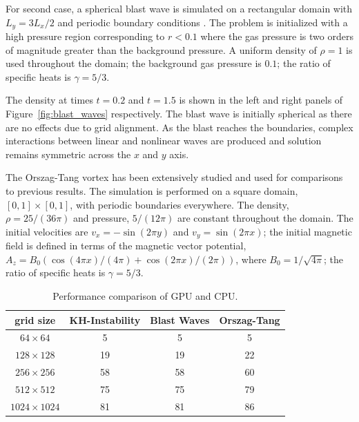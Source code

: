 For second case, a spherical blast wave is simulated on a rectangular domain with $L_y = 3L_x/2$ and periodic boundary conditions \citep{Zachary:1994,Balsara:1999,Londrillo:2000}.  The problem is initialized with a high pressure region corresponding to $r < 0.1$ where the gas pressure is two orders of magnitude greater than the background pressure.  A uniform density of $\rho = 1$ is used throughout the domain; the background gas pressure is $0.1$; the ratio of specific heats is $\gamma = 5/3$.

The density at times $t = 0.2$ and $t = 1.5$ is shown in the left and right panels of Figure~\ref{fig:blast_waves} respectively.  The blast wave is initially spherical as there are no effects due to grid alignment.  As the blast reaches the boundaries, complex interactions between linear and nonlinear waves are produced and solution remains symmetric across the $x$ and $y$ axis.  

The Orszag-Tang vortex \citep{Orszag:1979} has been extensively studied and used for comparisons to previous results.  The simulation is performed on a square domain, $[0,1] \times [0,1]$, with periodic boundaries everywhere.  The density, $\rho = 25/(36\pi)$ and pressure, $5/(12\pi)$ are constant throughout the domain.  The initial velocities are $v_x = -\sin{(2\pi y)}$ and $v_y = \sin{(2\pi x)}$; the initial magnetic field is defined in terms of the magnetic vector potential, $A_z = B_0\left(\cos{(4\pi x)}/(4\pi) + \cos{(2\pi x)}/(2\pi)\right)$, where $B_0 = 1/\sqrt{4\pi}$; the ratio  of specific heats is $\gamma = 5/3$.


\begin{table}[htbp]\figSpace
\caption{Performance comparison of GPU and CPU.}
\begin{tabular*}{\textwidth}{@{\extracolsep{\fill}} cccc}
\\ 
\hline 
\hline 
grid size & KH-Instability & Blast Waves & Orszag-Tang \\
\hline
$64\times64$ & 5 & 5 & 5 \\
$128\times128$ & 19 & 19 & 22 \\
$256\times256$ & 58 & 58 & 60 \\
$512\times512$ & 75 & 75 & 79 \\
$1024\times1024$ & 81 & 81 & 86 \\
\hline
\end{tabular*}
\label{tab:performance}
\figSpace
\end{table}

